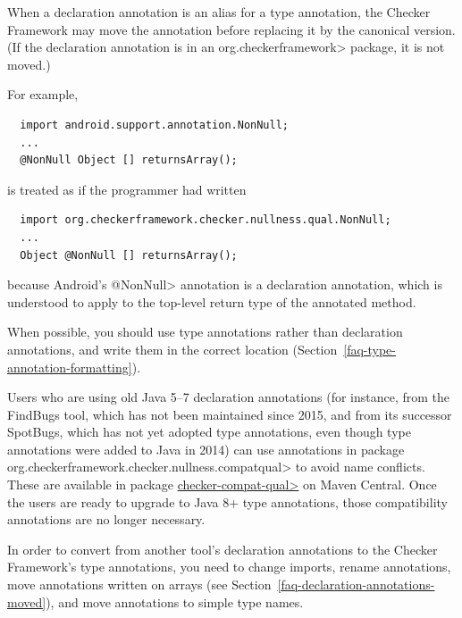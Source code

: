 \label{declaration-annotations-moved} %

When a declaration annotation is an alias for a type annotation, the
Checker Framework may move the annotation before replacing it by the
canonical version. (If the declaration annotation is in an \<org.checkerframework>
package, it is not moved.)

For example,

\begin{Verbatim}
  import android.support.annotation.NonNull;
  ...
  @NonNull Object [] returnsArray();
\end{Verbatim}

\noindent
is treated as if the programmer had written

\begin{Verbatim}
  import org.checkerframework.checker.nullness.qual.NonNull;
  ...
  Object @NonNull [] returnsArray();
\end{Verbatim}

\noindent
because Android's \<@NonNull> annotation is a declaration annotation, which
is understood to apply to the top-level return type of the annotated method.

When possible, you should use type annotations rather than declaration
annotations, and write them in the correct location
(Section~\ref{faq-type-annotation-formatting}).

Users who are using old Java 5--7 declaration annotations (for instance,
from the FindBugs tool, which has not been maintained since 2015, and from
its successor SpotBugs, which has not yet adopted type annotations, even
though type annotations were added to Java in 2014) can use annotations in
package \<org.checkerframework.checker.nullness.compatqual> to avoid name
conflicts.  These are available in package
\href{https://central.sonatype.com/search?q=a:checker-compat-qual}{\<checker-compat-qual>}
on Maven Central.  Once the users are ready to upgrade to Java 8+ type
annotations, those compatibility annotations are no longer necessary.



In order to convert from another tool's declaration annotations to the Checker Framework's type annotations,
you need to change imports, rename annotations, move annotations written on arrays (see Section~\ref{faq-declaration-annotations-moved}), and move annotations to simple type names.


